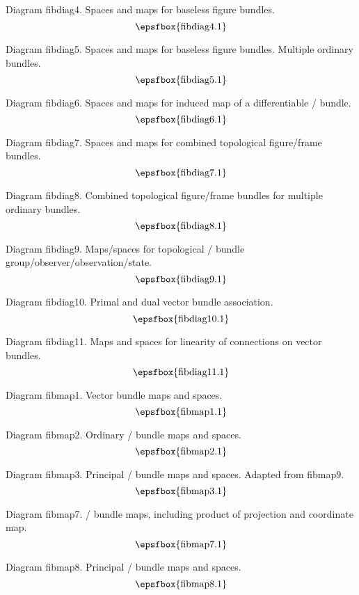 Diagram fibdiag4. Spaces and maps for baseless figure bundles.
$$
\centerline{\epsfbox{fibdiag4.1}}
$$

\filleject

Diagram fibdiag5. Spaces and maps for baseless figure bundles. Multiple
ordinary bundles.
$$
\centerline{\epsfbox{fibdiag5.1}}
$$

Diagram fibdiag6. Spaces and maps for induced map of a differentiable \fibre/
bundle.
$$
\centerline{\epsfbox{fibdiag6.1}}
$$

Diagram fibdiag7. Spaces and maps for combined topological figure/frame bundles.
$$
\centerline{\epsfbox{fibdiag7.1}}
$$

Diagram fibdiag8. Combined topological figure/frame bundles for multiple
ordinary bundles.
$$
\centerline{\epsfbox{fibdiag8.1}}
$$

\filleject

Diagram fibdiag9. Maps/spaces for topological \fibre/ bundle
group/observer/observation/state.
$$
\centerline{\epsfbox{fibdiag9.1}}
$$

Diagram fibdiag10. Primal and dual vector bundle association.
$$
\centerline{\epsfbox{fibdiag10.1}}
$$

Diagram fibdiag11. Maps and spaces for linearity of connections on vector
bundles.
$$
\centerline{\epsfbox{fibdiag11.1}}
$$

\secteject
\edef\SECTfibmap{\the\pageno}

Diagram fibmap1. Vector bundle maps and spaces.
$$
\centerline{\epsfbox{fibmap1.1}}
$$

Diagram fibmap2. Ordinary \fibre/ bundle maps and spaces.
$$
\centerline{\epsfbox{fibmap2.1}}
$$

Diagram fibmap3. Principal \fibre/ bundle maps and spaces. Adapted from fibmap9.
$$
\centerline{\epsfbox{fibmap3.1}}
$$

Diagram fibmap7. \Fibre/ bundle maps, including product of projection and
coordinate map.
$$
\centerline{\epsfbox{fibmap7.1}}
$$

\filleject

Diagram fibmap8. Principal \fibre/ bundle maps and spaces.
$$
\centerline{\epsfbox{fibmap8.1}}
$$

